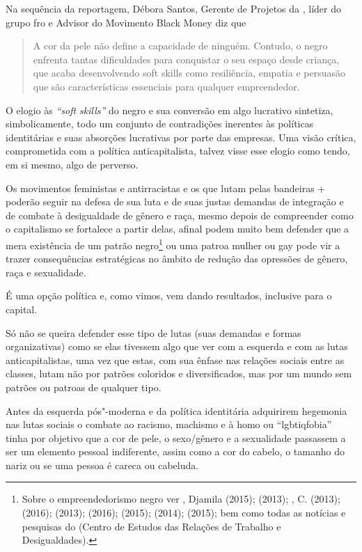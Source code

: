 Na sequência da reportagem, Débora Santos, Gerente de Projetos da ,
líder do grupo fro e Advisor do Movimento Black Money diz que

\begin{quote}
A cor da pele não define a capacidade de ninguém. Contudo, o negro
enfrenta tantas dificuldades para conquistar o seu espaço desde criança,
que acaba desenvolvendo soft skills como resiliência, empatia e
persuasão que são características essenciais para qualquer empreendedor.
\end{quote}

O elogio às \emph{``soft skills''} do negro e sua conversão em algo
lucrativo sintetiza, simbolicamente, todo um conjunto de contradições
inerentes às políticas identitárias e suas absorções lucrativas por
parte das empresas. Uma visão crítica, comprometida com a política
anticapitalista, talvez visse esse elogio como tendo, em si mesmo, algo
de perverso.

Os movimentos feministas e antirracistas e os que lutam pelas bandeiras
+ poderão seguir na defesa de sua luta e de suas justas demandas
de integração e de combate à desigualdade de gênero e raça, mesmo depois
de compreender como o capitalismo se fortalece a partir delas, afinal
podem muito bem defender que a mera existência de um patrão
negro\footnote{Sobre o empreendedorismo negro ver , Djamila
  (2015);  (2013); , C. (2013); 
  (2016);  (2013);  (2016);  (2015); 
  (2014);  (2015); bem como todas as notícias e pesquisas do 
  (Centro de Estudos das Relações de Trabalho e Desigualdades).} ou uma
patroa mulher ou gay pode vir a trazer consequências estratégicas no
âmbito de redução das opressões de gênero, raça e sexualidade.

É uma opção política e, como vimos, vem dando resultados, inclusive para
o capital.

Só não se queira defender esse tipo de lutas (suas demandas e formas
organizativas) como se elas tivessem algo que ver com a esquerda e com
as lutas anticapitalistas, uma vez que estas, com sua ênfase nas
relações sociais entre as classes, lutam não por patrões coloridos e
diversificados, mas por um mundo sem patrões ou patroas de qualquer
tipo.

Antes da esquerda pós"-moderna e da política identitária adquirirem
hegemonia nas lutas sociais o combate ao racismo, machismo e à homo ou
``lgbtiqfobia'' tinha por objetivo que a cor de pele, o sexo/gênero e a
sexualidade passassem a ser um elemento pessoal indiferente, assim como
a cor do cabelo, o tamanho do nariz ou se uma pessoa é careca ou
cabeluda.

